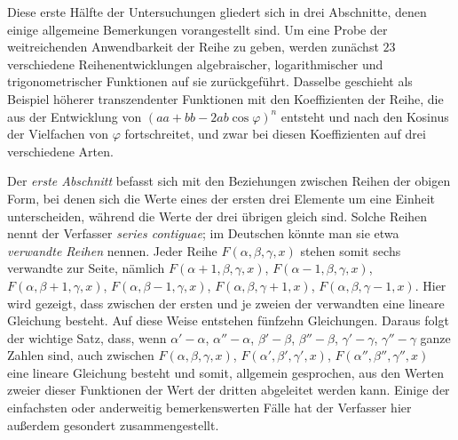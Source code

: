 Diese erste Hälfte der Untersuchungen gliedert sich in drei Abschnitte, denen einige allgemeine Bemerkungen vorangestellt sind. Um eine Probe der weitreichenden Anwendbarkeit der Reihe zu geben, werden zunächst $23$ verschiedene Reihenentwicklungen algebraischer, logarithmischer und trigonometrischer Funktionen auf sie zurückgeführt. Dasselbe geschieht als Beispiel höherer transzendenter Funktionen mit den Koeffizienten der Reihe, die aus der Entwicklung von $(aa+bb-2ab\cos\varphi)^n$ entsteht und nach den Kosinus der Vielfachen von $\varphi$ fortschreitet, und zwar bei diesen Koeffizienten auf drei verschiedene Arten.

Der \textit{erste Abschnitt} befasst sich mit den Beziehungen zwischen Reihen der obigen Form, bei denen sich die Werte eines der ersten drei Elemente um eine Einheit unterscheiden, während die Werte der drei übrigen gleich sind. Solche Reihen nennt der Verfasser \textit{series contiguae}; im Deutschen könnte man sie etwa \textit{verwandte Reihen} nennen. Jeder Reihe $F(\alpha,\beta,\gamma,x)$ stehen somit sechs verwandte zur Seite, nämlich $F(\alpha+1,\beta,\gamma,x)$, $F(\alpha-1,\beta,\gamma,x)$, $F(\alpha,\beta+1,\gamma,x)$, $F(\alpha,\beta-1,\gamma,x)$, $F(\alpha,\beta,\gamma+1,x)$, $F(\alpha,\beta,\gamma-1,x)$. Hier wird gezeigt, dass zwischen der ersten und je zweien der verwandten eine lineare Gleichung besteht. Auf diese Weise entstehen fünfzehn Gleichungen. Daraus folgt der wichtige Satz, dass, wenn $\alpha'-\alpha$, $\alpha''-\alpha$, $\beta'-\beta$, $\beta''-\beta$, $\gamma'-\gamma$, $\gamma''-\gamma$ ganze Zahlen sind, auch zwischen $F(\alpha,\beta,\gamma,x)$, $F(\alpha',\beta',\gamma',x)$, $F(\alpha'',\beta'',\gamma'',x)$ eine lineare Gleichung besteht und somit, allgemein gesprochen, aus den Werten zweier dieser Funktionen der Wert der dritten abgeleitet werden kann. Einige der einfachsten oder anderweitig bemerkenswerten Fälle hat der Verfasser hier außerdem gesondert zusammengestellt.

